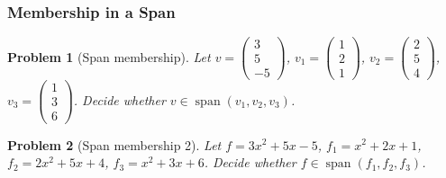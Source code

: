 \documentclass{article}
\newtheorem{problem}{Problem}
\newcommand{\Span}{\operatorname{span}}
\begin{document}
\subsubsection{Membership in a Span}
\begin{problem}[Span membership]
    Let $v=\begin{pmatrix}3\\5\\-5\end{pmatrix}$, $v_1=\begin{pmatrix}1\\2\\1\end{pmatrix}$, $v_2=\begin{pmatrix}2\\5\\4\end{pmatrix}$, $v_3=\begin{pmatrix}1\\3\\6\end{pmatrix}$. Decide whether $v \in \Span(v_1,v_2,v_3)$.
\end{problem}
\begin{problem}[Span membership 2]
    Let $f=3x^2+5x-5$, $f_1=x^2+2x+1$, $f_2=2x^2+5x+4$, $f_3=x^2+3x+6$. Decide whether $f \in \Span(f_1,f_2,f_3)$.
\end{problem}
\end{document}
